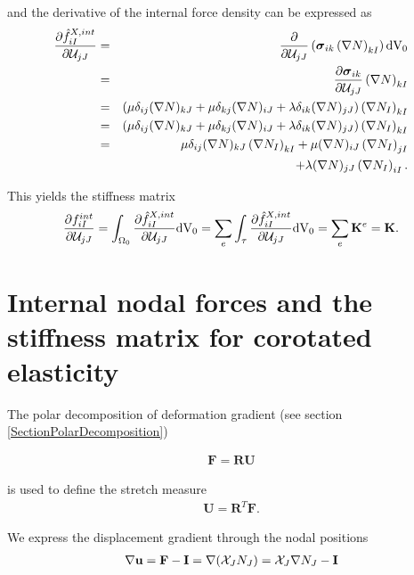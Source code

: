 and the derivative of the internal force density can be expressed as
\begin{eqnarray}
\frac{\partial \hat{f} ^{X,int}_{iI} }{\partial \mathcal{U}  _{jJ}} &=& \frac{\partial}{\partial \mathcal{U}  _{jJ}} \left( \boldsymbol{\sigma}_{ik}  \left( \nabla N \right)_{kI} \right)  \textnormal{dV}_0 \notag \\
&=&  \frac{\partial \boldsymbol{\sigma}_{ik}}{\partial \mathcal{U}  _{jJ}} \left( \nabla N \right)_{kI}  \notag \\
&=& \left( \mu \delta _{ij} (\nabla N)_{kJ} + \mu \delta _{kj} (\nabla N)_{iJ}  + \lambda \delta _{ik} (\nabla N)_{jJ} \right) \left( \nabla N_I  \right)_{kI}  \notag \\
&=& \left( \mu \delta _{ij} (\nabla N)_{kJ} + \mu \delta _{kj} (\nabla N)_{iJ}  + \lambda \delta _{ik} (\nabla N)_{jJ} \right) \left( \nabla N_I  \right)_{kI}  \notag \\
&=&   \mu \delta _{ij} (\nabla N)_{kJ} \left( \nabla N_I  \right)_{kI} + \mu (\nabla N)_{iJ} \left( \nabla N_I  \right)_{jI} \notag \\
& & + \lambda  (\nabla N)_{jJ} \left( \nabla N_I  \right)_{iI}.
\end{eqnarray}

This yields the stiffness matrix
\begin{eqnarray}
\frac{\partial f ^{int}_{iI} }{\partial \mathcal{U}  _{jJ}} = \int _{\Omega _0}  \frac{\partial \hat{f} ^{X,int}_{iI} }{\partial \mathcal{U}  _{jJ}}  \textnormal{dV}_0 = \sum_{e} \int _{\tau}  \frac{\partial \hat{f} ^{X,int}_{iI} }{\partial \mathcal{U}  _{jJ}}  \textnormal{dV}_0 = \sum_{e} \mathbf{K}^e =  \mathbf K.
\end{eqnarray}

\section{Internal nodal forces and the stiffness matrix for corotated elasticity} \label{ACorotNodalForces}

The polar decomposition of deformation gradient (see section \ref{SectionPolarDecomposition})

\begin{eqnarray}
\mathbf F = \mathbf R \mathbf U
\end{eqnarray}

is used to define the stretch measure
\begin{eqnarray}
\mathbf U = \mathbf {R} ^T \mathbf F.
\end{eqnarray}

We express the displacement gradient through the nodal positions 
\begin{eqnarray}
\nabla \mathbf {u}  = \mathbf {F } -  \mathbf {I } = \nabla ( \mathcal{X} _J  N_J  ) =  \mathcal{X} _J  \nabla  N_J  -  \mathbf {I }
\end{eqnarray}

